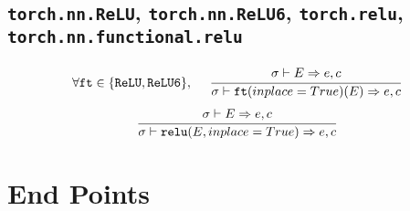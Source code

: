 \documentclass{article}
\begin{document}
\subsection*{\texttt{torch.nn.ReLU}, \texttt{torch.nn.ReLU6}, \texttt{torch.relu}, \texttt{torch.nn.functional.relu}}
\begin{align*}
  \forall \mathtt{ft} \in \{ \mathtt{ReLU}, \mathtt{ReLU6} \}, \,\,\,\,\,\,\,\,
  \frac
  {
    \begin{array}{l}
      \sigma \vdash E \Rightarrow e, c
    \end{array}
  }
  {
    \sigma \vdash \mathtt{ft(}inplace=True\mathtt{)(}E\mathtt{)} \Rightarrow e, c
  }
\end{align*}
\begin{align*}
  \frac
  {
    \begin{array}{l}
      \sigma \vdash E \Rightarrow e, c
    \end{array}
  }
  {
    \sigma \vdash \mathtt{relu(}E, inplace=True\mathtt{)} \Rightarrow e, c
  }
\end{align*}


\section*{End Points}
\end{document}
